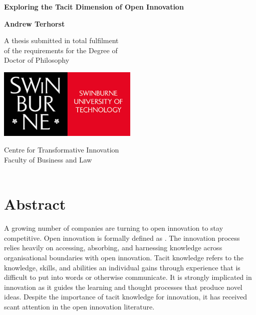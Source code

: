 \documentclass[12pt,table]{book}
\renewcommand{\today}{\the\day \ \monthname \ \the\year}
\begin{document}
\frontmatter

\begin{titlepage}
\renewcommand{\today}{\monthname \ \the\year}
\begin{center}
\vspace*{1cm}

\Huge
\textbf{Exploring the Tacit Dimension of Open Innovation}\\
\vspace{1cm}

\Large
\textbf{Andrew Terhorst}
\vfill

\Large
A thesis submitted in total fulfilment\\
of the requirements for the Degree of \\
Doctor of Philosophy

\vspace{1cm}

\includegraphics[width=0.5\textwidth]{Images/swinburne_university_of_technology.png} 

\vspace{1cm}

\Large
Centre for Transformative Innovation\\
Faculty of Business and Law\\
\today
\end{center}
\end{titlepage}

\doublespacing

\chapter*{Abstract}

A growing number of companies are turning to open innovation to stay competitive. Open innovation is formally defined as  \citep{chesbrough2014explicating}. The innovation process relies heavily on accessing, absorbing, and harnessing knowledge across organisational boundaries with open innovation. Tacit knowledge refers to the knowledge, skills, and abilities an individual gains through experience that is difficult to put into words or otherwise communicate. It is strongly implicated in innovation as it guides the learning and thought processes that produce novel ideas. Despite the importance of tacit knowledge for innovation, it has received scant attention in the open innovation literature. \medskip
\end{document}
